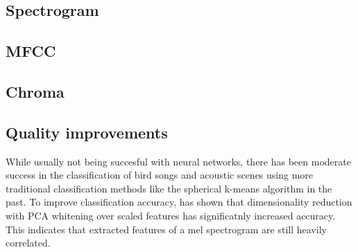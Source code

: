 

\subsection{Spectrogram}

\subsection{MFCC}

\subsection{Chroma}

\subsection{Quality improvements}
While usually not being succesful with neural networks, there has been moderate success in the classification of bird songs and acoustic scenes using more traditional classification methods like the spherical k-means algorithm in the past. To improve classification accuracy, \cite{Coates2012} has shown that dimensionality reduction with PCA whitening over scaled features has significatnly increased accuracy. 
This indicates that extracted features of a mel spectrogram are still heavily correlated.


